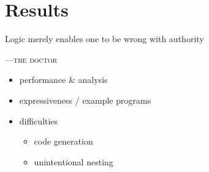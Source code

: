 %
%

\chapter{Results}


\epigraph{Logic merely enables one to be wrong with authority}%
{\textsc{---the doctor}} %

\begin{itemize}
    \item performance \& analysis
    \item expressiveness / example programs
    \item difficulties
    \begin{itemize}
        \item code generation
        \item unintentional nesting
    \end{itemize}
\end{itemize}

